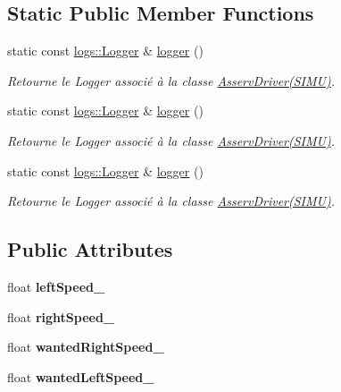 \subsection*{Static Public Member Functions}
\begin{DoxyCompactItemize}
\item 
\mbox{\label{classAsservDriver_a037c58098a47f261e1b2fd97cc818ff5}} 
static const \hyperlink{classlogs_1_1Logger}{logs\+::\+Logger} \& \hyperlink{classAsservDriver_a037c58098a47f261e1b2fd97cc818ff5}{logger} ()
\begin{DoxyCompactList}\small\item\em Retourne le Logger associé à la classe \hyperlink{classAsservDriver}{Asserv\+Driver(\+S\+I\+M\+U)}. \end{DoxyCompactList}\item 
\mbox{\label{classAsservDriver_a037c58098a47f261e1b2fd97cc818ff5}} 
static const \hyperlink{classlogs_1_1Logger}{logs\+::\+Logger} \& \hyperlink{classAsservDriver_a037c58098a47f261e1b2fd97cc818ff5}{logger} ()
\begin{DoxyCompactList}\small\item\em Retourne le Logger associé à la classe \hyperlink{classAsservDriver}{Asserv\+Driver(\+S\+I\+M\+U)}. \end{DoxyCompactList}\item 
\mbox{\label{classAsservDriver_a037c58098a47f261e1b2fd97cc818ff5}} 
static const \hyperlink{classlogs_1_1Logger}{logs\+::\+Logger} \& \hyperlink{classAsservDriver_a037c58098a47f261e1b2fd97cc818ff5}{logger} ()
\begin{DoxyCompactList}\small\item\em Retourne le Logger associé à la classe \hyperlink{classAsservDriver}{Asserv\+Driver(\+S\+I\+M\+U)}. \end{DoxyCompactList}\end{DoxyCompactItemize}
\subsection*{Public Attributes}
\begin{DoxyCompactItemize}
\item 
\mbox{\label{classAsservDriver_aec40831099c748cebba875b31e852a93}} 
float {\bfseries left\+Speed\+\_\+}
\item 
\mbox{\label{classAsservDriver_a90ccd7181fdb13b410ab698c88b95d57}} 
float {\bfseries right\+Speed\+\_\+}
\item 
\mbox{\label{classAsservDriver_a35d0b630daeaa1c7dd128977c8756183}} 
float {\bfseries wanted\+Right\+Speed\+\_\+}
\item 
\mbox{\label{classAsservDriver_a015787cac1c12d82e87f0d49810b9d7f}} 
float {\bfseries wanted\+Left\+Speed\+\_\+}
\end{DoxyCompactItemize}
